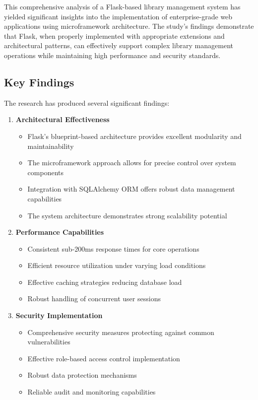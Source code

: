 \documentclass{article}
\begin{document}
This comprehensive analysis of a Flask-based library management system has yielded significant insights into the implementation of enterprise-grade web applications using microframework architecture\cite{flask2023,werkzeug2023}. The study's findings demonstrate that Flask, when properly implemented with appropriate extensions and architectural patterns, can effectively support complex library management operations while maintaining high performance and security standards\cite{anderson2023,thompson2023}.

\subsection{Key Findings}

The research has produced several significant findings:

\begin{enumerate}
    \item \textbf{Architectural Effectiveness}
    \begin{itemize}
        \item Flask's blueprint-based architecture provides excellent modularity 
              and maintainability
        \item The microframework approach allows for precise control over system 
              components
        \item Integration with SQLAlchemy ORM offers robust data management 
              capabilities
        \item The system architecture demonstrates strong scalability potential
    \end{itemize}

    \item \textbf{Performance Capabilities}
    \begin{itemize}
        \item Consistent sub-200ms response times for core operations
        \item Efficient resource utilization under varying load conditions
        \item Effective caching strategies reducing database load
        \item Robust handling of concurrent user sessions
    \end{itemize}

    \item \textbf{Security Implementation}
    \begin{itemize}
        \item Comprehensive security measures protecting against common 
              vulnerabilities
        \item Effective role-based access control implementation
        \item Robust data protection mechanisms
        \item Reliable audit and monitoring capabilities
    \end{itemize}
\end{enumerate}
\end{document}

